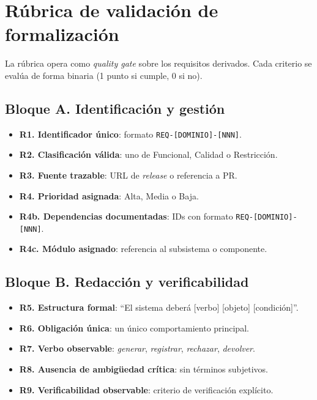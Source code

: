 \section{R\'ubrica de validaci\'on de formalizaci\'on}
\label{sec:anexo-rubrica}

La r\'ubrica opera como \emph{quality gate} sobre los requisitos derivados. Cada criterio se eval\'ua de forma binaria (1 punto si cumple, 0 si no).

\subsection*{Bloque A. Identificaci\'on y gesti\'on}

\begin{itemize}
    \item \textbf{R1. Identificador \'unico}: formato \texttt{REQ-[DOMINIO]-[NNN]}.
    \item \textbf{R2. Clasificaci\'on v\'alida}: uno de Funcional, Calidad o Restricci\'on.
    \item \textbf{R3. Fuente trazable}: URL de \emph{release} o referencia a PR.
    \item \textbf{R4. Prioridad asignada}: Alta, Media o Baja.
    \item \textbf{R4b. Dependencias documentadas}: IDs con formato \texttt{REQ-[DOMINIO]-[NNN]}.
    \item \textbf{R4c. M\'odulo asignado}: referencia al subsistema o componente.
\end{itemize}

\subsection*{Bloque B. Redacci\'on y verificabilidad}

\begin{itemize}
    \item \textbf{R5. Estructura formal}: ``El sistema deber\'a [verbo] [objeto] [condici\'on]''.
    \item \textbf{R6. Obligaci\'on \'unica}: un \'unico comportamiento principal.
    \item \textbf{R7. Verbo observable}: \emph{generar}, \emph{registrar}, \emph{rechazar}, \emph{devolver}.
    \item \textbf{R8. Ausencia de ambig\"uedad cr\'itica}: sin t\'erminos subjetivos.
    \item \textbf{R9. Verificabilidad observable}: criterio de verificaci\'on expl\'icito.
\end{itemize}

